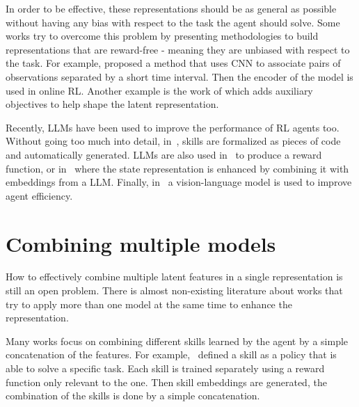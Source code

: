 In order to be effective, these representations should be as general as possible without having any bias with respect to the task the agent should solve.
Some works try to overcome this problem by presenting methodologies to build representations that are reward-free - meaning they are unbiased with respect to the task.
For example, \citet{stooke2021decoupling} proposed a method that uses CNN to associate pairs of observations separated by a short time interval.
Then the encoder of the model is used in online RL.
Another example is the work of \citet{lan2023bootstrapped} which adds auxiliary objectives to help shape the latent representation.

Recently, LLMs have been used to improve the performance of RL agents too.
Without going too much into detail, in~\citet{wang2023voyager}, skills are formalized as pieces of code and automatically generated.
LLMs are also used in~\citet{yu2023language} to produce a reward function, or in~\citet{lifshitz2024steve} where the state representation is enhanced by combining it with embeddings from a LLM\@.
Finally, in~\citet{brohan2023rt} a vision-language model is used to improve agent efficiency.



\section{Combining multiple models}\label{sec:fm_rl_combination}

How to effectively combine multiple latent features in a single representation is still an open problem.
There is almost non-existing literature about works that try to apply more than one model at the same time to enhance the representation.

Many works focus on combining different skills learned by the agent by a simple concatenation of the features.
For example,~\citet{sahni2017learning} defined a skill as a policy that is able to solve a specific task.
Each skill is trained separately using a reward function only relevant to the one.
Then skill embeddings are generated, the combination of the skills is done by a simple concatenation.


